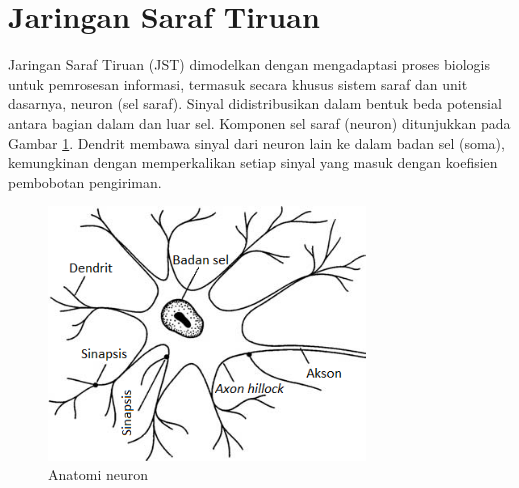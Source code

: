 

\section{Jaringan Saraf Tiruan}
Jaringan Saraf Tiruan (JST) dimodelkan dengan mengadaptasi proses biologis untuk pemrosesan informasi, termasuk secara khusus sistem saraf dan unit dasarnya, neuron (sel saraf). Sinyal didistribusikan dalam bentuk beda potensial antara bagian dalam dan luar sel. Komponen sel saraf (neuron) ditunjukkan pada Gambar \ref{fig:3:neuron}. Dendrit membawa sinyal dari neuron lain ke dalam badan sel (soma), kemungkinan dengan memperkalikan setiap sinyal yang masuk dengan koefisien pembobotan pengiriman.\cite{NNControlBook}

\begin{figure}[!h]
	\centering
	\includegraphics[width=0.75\textwidth]{figures/neuron}
	\caption{Anatomi neuron \cite{NNControlBook}}
	\label{fig:3:neuron}
\end{figure}

